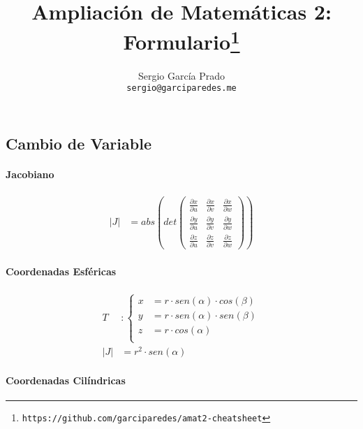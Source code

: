 \documentclass{article}
\title{Ampliación de Matemáticas 2: Formulario\footnote{\texttt{https://github.com/garciparedes/amat2-cheatsheet}}}
\author{Sergio García Prado \\ \texttt{sergio@garciparedes.me}}
\begin{document}

  \maketitle

  \begin{multicols}{2}


    \section{Cambio de Variable}

      \paragraph{Jacobiano}

      \begin{align*}
        \left|J\right| &= abs\left(det\left(
          \begin{array}{ccc}
            \frac{\partial x}{\partial u} & \frac{\partial x}{\partial v} & \frac{\partial x}{\partial w} \\
            \frac{\partial y}{\partial u} & \frac{\partial y}{\partial v} & \frac{\partial y}{\partial w} \\
            \frac{\partial z}{\partial u} & \frac{\partial z}{\partial v} & \frac{\partial z}{\partial w}
          \end{array}
        \right)\right)
      \end{align*}


      \paragraph{Coordenadas Esféricas}

        \begin{align*}
          T &:
          \begin{cases}
            x &= r \cdot sen(\alpha) \cdot cos(\beta) \\
            y &= r \cdot sen(\alpha) \cdot sen(\beta) \\
            z &= r \cdot cos(\alpha) \\
          \end{cases} \\
          \left|J\right| &= r ^ 2 \cdot sen(\alpha)
        \end{align*}

      \paragraph{Coordenadas Cilíndricas}


\end{multicols}
\end{document}
